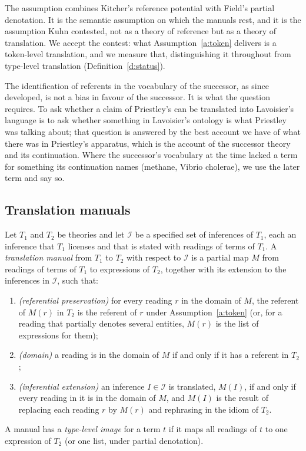 \documentclass{situationist-preprint}
\begin{document}
The assumption combines Kitcher's reference potential with Field's partial denotation. It is the semantic assumption on which the manuals rest, and it is the assumption Kuhn contested, not as a theory of reference but as a theory of translation. We accept the contest: what Assumption~\ref{a:token} delivers is a token-level translation, and we measure that, distinguishing it throughout from type-level translation (Definition~\ref{d:status}).

The identification of referents in the vocabulary of the successor, as since developed, is not a bias in favour of the successor. It is what the question requires. To ask whether a claim of Priestley's can be translated into Lavoisier's language is to ask whether something in Lavoisier's ontology is what Priestley was talking about; that question is answered by the best account we have of what there was in Priestley's apparatus, which is the account of the successor theory and its continuation. Where the successor's vocabulary at the time lacked a term for something its continuation names (methane, Vibrio cholerae), we use the later term and say so.

\subsection{Translation manuals}

\begin{definition}\label{d:manual}
Let $T_1$ and $T_2$ be theories and let $\mathcal{I}$ be a specified set of inferences of $T_1$, each an inference that $T_1$ licenses and that is stated with readings of terms of $T_1$. A \emph{translation manual} from $T_1$ to $T_2$ with respect to $\mathcal{I}$ is a partial map $M$ from readings of terms of $T_1$ to expressions of $T_2$, together with its extension to the inferences in $\mathcal{I}$, such that:
\begin{enumerate}[label=(\roman*)]
\item \emph{(referential preservation)} for every reading $r$ in the domain of $M$, the referent of $M(r)$ in $T_2$ is the referent of $r$ under Assumption~\ref{a:token} (or, for a reading that partially denotes several entities, $M(r)$ is the list of expressions for them);
\item \emph{(domain)} a reading is in the domain of $M$ if and only if it has a referent in $T_2$;
\item \emph{(inferential extension)} an inference $I \in \mathcal{I}$ is translated, $M(I)$, if and only if every reading in it is in the domain of $M$, and $M(I)$ is the result of replacing each reading $r$ by $M(r)$ and rephrasing in the idiom of $T_2$.
\end{enumerate}
A manual has a \emph{type-level image} for a term $t$ if it maps all readings of $t$ to one expression of $T_2$ (or one list, under partial denotation).
\end{definition}
\end{document}
